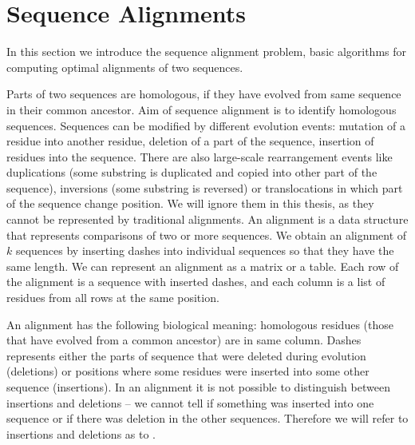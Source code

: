 \section{Sequence Alignments}

In this section we introduce the sequence alignment problem, basic algorithms
for computing optimal alignments of two sequences.

Parts of two sequences are homologous, if they have evolved from same sequence
in their common ancestor. Aim of sequence alignment is to identify homologous
sequences. Sequences can be modified by different evolution events:
mutation of a residue into another residue, deletion of a part of the sequence,
insertion of residues into the sequence. There are also large-scale
rearrangement events like duplications (some substring is duplicated and
copied into other part of the sequence), inversions (some substring is
reversed) or translocations in which part of the sequence change position.  We will
ignore them in this thesis, as they cannot be represented by traditional
alignments. An alignment is a data structure that represents comparisons of two
or more sequences. We obtain an alignment of $k$ sequences by inserting dashes
into individual sequences so that they have the same length. We can represent an
alignment as a matrix or a table. Each row of the alignment is a sequence with
inserted dashes, and each column is a list of residues from all rows at the same
position.


An alignment has the following biological meaning: homologous residues (those that
have evolved from a common ancestor) are in same column. Dashes represents
either the parts of sequence that were deleted during evolution (deletions) or
positions where some residues were inserted into some other sequence
(insertions). In an alignment it is not possible to distinguish between insertions and
deletions -- we cannot tell if something was inserted into one sequence or if
there was deletion in the other sequences. Therefore we will refer to insertions
and deletions as to .

